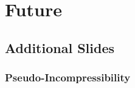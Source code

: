 \documentclass{beamer}
\begin{document}
\section{Future}

\frame{\tableofcontents[hideothersubsections]}



\subsection{Additional Slides}

\frame{\tableofcontents[hideothersubsections]}

\subsubsection{Pseudo-Incompressibility}
\end{document}
